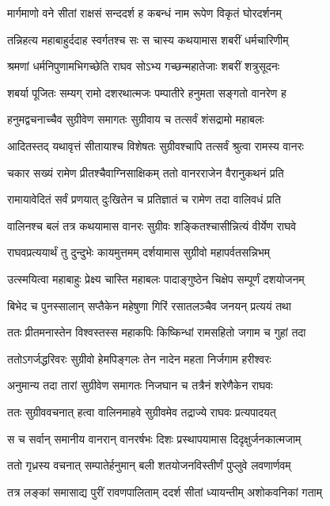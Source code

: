 \twolineshloka
{मार्गमाणो वने सीतां राक्षसं सन्ददर्श ह}
{कबन्धं नाम रूपेण विकृतं घोरदर्शनम्} %

\twolineshloka
{तन्निहत्य महाबाहुर्ददाह स्वर्गतश्च सः}
{स चास्य कथयामास शबरीं धर्मचारिणीम्} %

\twolineshloka
{श्रमणां धर्मनिपुणामभिगच्छेति राघव}
{सोऽभ्य गच्छन्महातेजाः शबरीं शत्रुसूदनः} %

\twolineshloka
{शबर्या पूजितः सम्यग् रामो दशरथात्मजः}
{पम्पातीरे हनुमता सङ्गतो वानरेण ह} %

\twolineshloka
{हनुमद्वचनाच्चैव सुग्रीवेण समागतः}
{सुग्रीवाय च तत्सर्वं शंसद्रामो महाबलः} %

\twolineshloka
{आदितस्तद् यथावृत्तं सीतायाश्च विशेषतः}
{सुग्रीवश्चापि तत्सर्वं श्रुत्वा रामस्य वानरः} %

\twolineshloka
{चकार सख्यं रामेण प्रीतश्चैवाग्निसाक्षिकम्}
{ततो वानरराजेन वैरानुकथनं प्रति} %

\twolineshloka
{रामायावेदितं सर्वं प्रणयात् दुःखितेन च}
{प्रतिज्ञातं च रामेण तदा वालिवधं प्रति} %

\twolineshloka
{वालिनश्च बलं तत्र कथयामास वानरः}
{सुग्रीवः शङ्कितश्चासीन्नित्यं वीर्येण राघवे} %

\twolineshloka
{राघवप्रत्ययार्थं तु दुन्दुभेः कायमुत्तमम्}
{दर्शयामास सुग्रीवो महापर्वतसन्निभम्} %

\twolineshloka
{उत्स्मयित्वा महाबाहुः प्रेक्ष्य चास्ति महाबलः}
{पादाङ्गुष्ठेन चिक्षेप सम्पूर्णं दशयोजनम्} %

\twolineshloka
{बिभेद च पुनस्सालान् सप्तैकेन महेषुणा}
{गिरिं रसातलञ्चैव जनयन् प्रत्ययं तथा} %

\twolineshloka
{ततः प्रीतमनास्तेन विश्वस्तस्स महाकपिः}
{किष्किन्धां रामसहितो जगाम च गुहां तदा} %

\twolineshloka
{ततोऽगर्जद्धरिवरः सुग्रीवो हेमपिङ्गलः}
{तेन नादेन महता निर्जगाम हरीश्वरः} %

\twolineshloka
{अनुमान्य तदा तारां सुग्रीवेण समागतः}
{निजघान च तत्रैनं शरेणैकेन राघवः} %

\twolineshloka
{ततः सुग्रीववचनात् हत्वा वालिनमाहवे}
{सुग्रीवमेव तद्राज्ये राघवः प्रत्यपादयत्} %

\twolineshloka
{स च सर्वान् समानीय वानरान् वानरर्षभः}
{दिशः प्रस्थापयामास दिदृक्षुर्जनकात्मजाम्} %

\twolineshloka
{ततो गृध्रस्य वचनात् सम्पातेर्हनुमान् बली}
{शतयोजनविस्तीर्णं पुप्लुवे लवणार्णवम्} %

\twolineshloka
{तत्र लङ्कां समासाद्य पुरीं रावणपालिताम्}
{ददर्श सीतां ध्यायन्तीम् अशोकवनिकां गताम्} %

